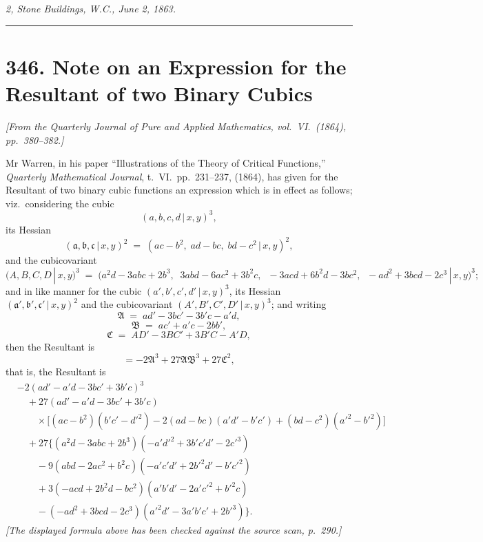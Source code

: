 \documentclass[11pt,a4paper]{article}
\providecommand{\mid}{\,|\,}
\begin{document}
\medskip

\noindent\textit{2, Stone Buildings, W.C., June 2, 1863.}

\bigskip
\noindent\rule{\textwidth}{0.4pt}
\bigskip

\section*{346. Note on an Expression for the Resultant of two Binary Cubics}

\noindent\textit{[From the Quarterly Journal of Pure and Applied Mathematics, vol.~VI.\ (1864), pp.~380--382.]}

\medskip

Mr Warren, in his paper ``Illustrations of the Theory of Critical Functions,'' \textit{Quarterly Mathematical Journal}, t.~VI.\ pp.~231--237, (1864), has given for the Resultant of two binary cubic functions an expression which is in effect as follows; viz.\ considering the cubic
\[
(a, b, c, d \mid x, y)^3,
\]
its Hessian
\[
(\mathfrak{a}, \mathfrak{b}, \mathfrak{c} \mid x, y)^2 \;=\; (ac - b^2,\; ad - bc,\; bd - c^2 \mid x, y)^2,
\]
and the cubicovariant
\[
(A, B, C, D \mid x, y)^3 \;=\; \bigl( a^2 d - 3abc + 2b^3,\;\; 3abd - 6ac^2 + 3b^2 c,\;\; -3acd + 6b^2 d - 3bc^2,\;\; -ad^2 + 3bcd - 2c^3 \mid x, y\bigr)^3;
\]
and in like manner for the cubic $(a', b', c', d' \mid x, y)^3$, its Hessian $(\mathfrak{a}', \mathfrak{b}', \mathfrak{c}' \mid x, y)^2$ and the cubicovariant $(A', B', C', D' \mid x, y)^3$; and writing
\[
\mathfrak{A} \;=\; ad' - 3bc' - 3b'c - a'd,
\]
\[
\mathfrak{B} \;=\; ac' + a'c - 2bb',
\]
\[
\mathfrak{C} \;=\; AD' - 3BC' + 3B'C - A'D,
\]
then the Resultant is
\[
= -2\mathfrak{A}^3 + 27\mathfrak{A}\mathfrak{B}^3 + 27\mathfrak{C}^2,
\]
that is, the Resultant is
\begin{align*}
& -2(ad' - a'd - 3bc' + 3b'c)^3 \\
& \quad + 27(ad' - a'd - 3bc' + 3b'c) \\
& \qquad \times \bigl[(ac - b^2)(b'c' - d'^2) - 2(ad - bc)(a'd' - b'c') + (bd - c^2)(a'^2 - b'^2)\bigr] \\
& \quad + 27\bigl\{ (a^2 d - 3abc + 2b^3)(-a'd'^2 + 3b'c'd' - 2c'^3) \\
& \qquad - 9(abd - 2ac^2 + b^2 c)(-a'c'd' + 2b'^2 d' - b'c'^2) \\
& \qquad + 3(-acd + 2b^2 d - bc^2)(a'b'd' - 2a'c'^2 + b'^2 c) \\
& \qquad - (-ad^2 + 3bcd - 2c^3)(a'^2 d' - 3a'b'c' + 2b'^3)\bigr\}.
\end{align*}
\textit{[The displayed formula above has been checked against the source scan, p.~290.]}
\end{document}

